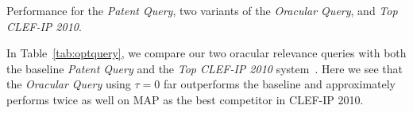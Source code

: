 \begin{table}[t!]
  \begin{center}
   \caption{Performance for the {\em Patent Query}, two variants of the {\em Oracular Query}, and {\em Top CLEF-IP 2010}.}
   \vspace*{1ex}
     
  \label{tab:optquery}
  \end{center}  
\end{table}

In Table~\ref{tab:optquery}, we compare our two oracular relevance
queries with both the baseline \emph{Patent Query} and the \emph{Top
CLEF-IP 2010} system~\cite{lopez2010experiments}.  Here we see that
the {\em Oracular Query} using $\tau=0$ far outperforms the baseline and
approximately performs twice as well on MAP as the best competitor in
CLEF-IP 2010.

%
%


